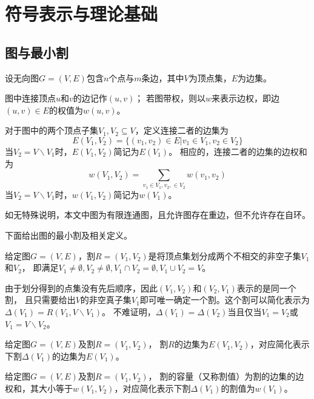 \chapter{符号表示与理论基础}

\section{图与最小割}

设无向图$G=(V,E)$包含$n$个点与$m$条边，其中$V$为顶点集，$E$为边集。

图中连接顶点$u$和$v$的边记作$(u,v)$；
若图带权，则以$w$来表示边权，即边$(u,v)\in E$的权值为$w(u,v)$。

对于图中的两个顶点子集$V_1,V_2\subseteq V$，定义连接二者的边集为
\begin{equation}
    E(V_1,V_2)=\{(v_1,v_2)\in E|v_1\in V_1,v_2\in V_2\}
\end{equation}
当$V_2=V\backslash V_1$时，$E(V_1,V_2)$简记为$E(V_1)$。
相应的，连接二者的边集的边权和为
\begin{equation}
    w(V_1,V_2)=\sum_{v_1\in V_1,v_2,\in V_2}w(v_1,v_2)
\end{equation}
当$V_2=V\backslash V_1$时，$w(V_1,V_2)$简记为$w(V_1)$。

如无特殊说明，本文中图为有限连通图，且允许图存在重边，但不允许存在自环。

下面给出图的最小割及相关定义。
\begin{definition}
   给定图$G=(V,E)$，割$R=(V_1,V_2)$是将顶点集划分成两个不相交的非空子集$V_1$和$V_2$，
   即满足$V_1\neq \emptyset,V_2\neq \emptyset,V_1\cap V_2=\emptyset,V_1\cup V_2=V$。
\end{definition}
由于划分得到的点集没有先后顺序，因此$(V_1,V_2)$和$(V_2,V_1)$表示的是同一个割，
且只需要给出$V$的非空真子集$V_1$即可唯一确定一个割。这个割可以简化表示为$\Delta(V_1)=R(V_1,V\backslash V_1)$。
不难证明，$\Delta(V_1)=\Delta(V_2)$当且仅当$V_1=V_2$或$V_1=V\backslash V_2$。

\begin{definition}
    给定图$G=(V,E)$及割$R=(V_1,V_2)$，
    割$R$的边集为$E(V_1,V_2)$，对应简化表示下割$\Delta(V_1)$的边集为$E(V_1)$。
\end{definition}

\begin{definition}
    给定图$G=(V,E)$及割$R=(V_1,V_2)$，
    割的容量（又称割值）为割的边集的边权和，其大小等于$ w(V_1,V_2)$，对应简化表示下割$\Delta(V_1)$的割值为$w(V_1)$。
\end{definition}


